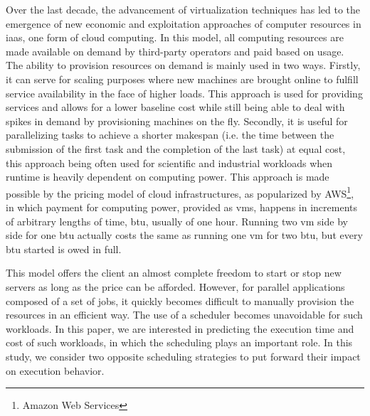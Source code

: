\documentclass[10pt,conference,compsocconf]{IEEEtran}
\begin{document}
Over the  last decade, the advancement  of virtualization techniques has  led to
the emergence of new economic  and exploitation approaches of computer resources
in  \ac{iaas},  one form  of cloud  computing. In  this model,  all
computing resources  are made available  on demand by third-party  operators and
paid based  on usage.  The  ability to provision  resources on demand  is mainly
used in two ways.  Firstly, it can serve for scaling purposes where new machines
are  brought online  to  fulfill  service availability  in  the  face of  higher
loads.  This approach  is used  for  providing services  and allows  for a  lower
baseline  cost  while  still  being  able  to deal  with  spikes  in  demand  by
provisioning machines on the fly. Secondly, it is useful for parallelizing tasks
to achieve a shorter makespan (i.e. the time between the submission of the first
task and the completion of the  last task)  at equal  cost, this  approach being  often used  for
scientific  and  industrial  workloads  when runtime  is  heavily  dependent  on
computing power.  This  approach is made possible by the  pricing model of cloud
infrastructures, as  popularized by AWS\footnote{Amazon Web  Services}, in which
payment  for computing  power, provided  as \acp{vm},  happens in  increments of
arbitrary lengths  of time, \ac{btu}, usually  of one hour. Running  two \ac{vm}
side by side for one \ac{btu} actually costs the same as running one \ac{vm} for two
\ac{btu}, but every \ac{btu} started is owed in full.

This model  offers the client  an almost complete freedom  to start or  stop new
servers as long as the price can be afforded. However, for parallel applications composed
of a set of jobs, it  quickly  becomes  difficult  to manually  provision  the
resources in an  efficient way.  The use of a  scheduler becomes unavoidable for
such workloads.   In this paper, we  are interested in predicting  the execution
time  and cost  of such  workloads, in  which the  scheduling plays  an
important role.  In  this study, we consider two  opposite scheduling strategies
to put forward their impact on execution behavior.
\end{document}
